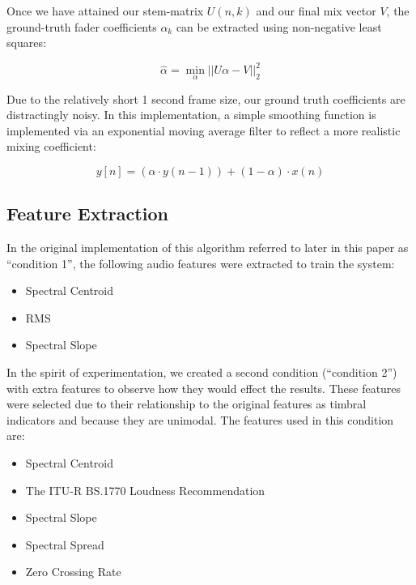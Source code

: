 \documentclass{article}
\begin{document}
Once we have attained our stem-matrix $U(n, k)$ and our final mix vector $V$, the ground-truth fader coefficients $\alpha_k$ can be extracted using non-negative least squares:

\begin{equation}
\hat{\alpha} = \min_{\alpha}||U\alpha - V||_{2}^{2}
\label{eq:NNNLS1}
\end{equation}

Due to the relatively short 1 second frame size, our ground truth coefficients are distractingly noisy.  In this implementation, a simple smoothing function is implemented via an exponential moving average filter to reflect a more realistic mixing coefficient:

\begin{equation}
\label{eq:EMA}
y[n] = (\alpha \cdot y(n-1)) + (1-\alpha) \cdot x(n)
\end{equation}

\subsection{Feature Extraction}
\label{subsec:Feature Extraction}

In the original implementation of this algorithm referred to later in this paper as ``condition 1'', the following audio features were extracted to train the system:

\begin{itemize}
  \item Spectral Centroid
  \item RMS
  \item Spectral Slope
\end{itemize}

In the spirit of experimentation, we created a second condition (``condition 2'') with extra features to observe how they would effect the results.  These features were selected due to their relationship to the original features as timbral indicators and because they are unimodal.  The features used in this condition are:

\begin{itemize}
  \item Spectral Centroid
  \item The ITU-R BS.1770 Loudness Recommendation
  \item Spectral Slope
  \item Spectral Spread
  \item Zero Crossing Rate
\end{itemize}
\end{document}
